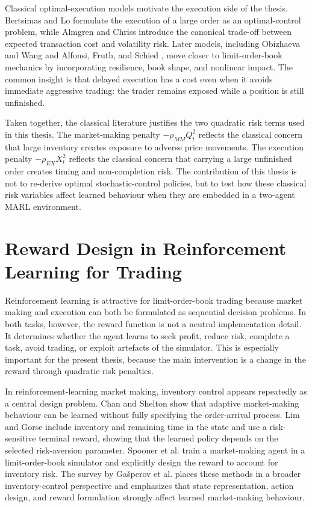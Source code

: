 \documentclass[oneside]{uva-inf-bachelor-thesis}
\begin{document}
Classical optimal-execution models motivate the execution side of the thesis. Bertsimas and Lo \cite{bertsimas_optimal_1998} formulate the execution of a large order as an optimal-control problem, while Almgren and Chriss \cite{almgren2000} introduce the canonical trade-off between expected transaction cost and volatility risk. Later models, including Obizhaeva and Wang \cite{obizhaeva_optimal_2005} and Alfonsi, Fruth, and Schied \cite{alfonsi_optimal_2010}, move closer to limit-order-book mechanics by incorporating resilience, book shape, and nonlinear impact. The common insight is that delayed execution has a cost even when it avoids immediate aggressive trading: the trader remains exposed while a position is still unfinished.

Taken together, the classical literature justifies the two quadratic risk terms used in this thesis. The market-making penalty \(-\rho_{MM}Q_t^2\) reflects the classical concern that large inventory creates exposure to adverse price movements. The execution penalty \(-\rho_{EX}X_t^2\) reflects the classical concern that carrying a large unfinished order creates timing and non-completion risk. The contribution of this thesis is not to re-derive optimal stochastic-control policies, but to test how these classical risk variables affect learned behaviour when they are embedded in a two-agent MARL environment.

\section{Reward Design in Reinforcement Learning for Trading}

Reinforcement learning is attractive for limit-order-book trading because market making and execution can both be formulated as sequential decision problems. In both tasks, however, the reward function is not a neutral implementation detail. It determines whether the agent learns to seek profit, reduce risk, complete a task, avoid trading, or exploit artefacts of the simulator. This is especially important for the present thesis, because the main intervention is a change in the reward through quadratic risk penalties.

In reinforcement-learning market making, inventory control appears repeatedly as a central design problem. Chan and Shelton \cite{chan_electronic_2001} show that adaptive market-making behaviour can be learned without fully specifying the order-arrival process. Lim and Gorse \cite{lim_reinforcement_nodate} include inventory and remaining time in the state and use a risk-sensitive terminal reward, showing that the learned policy depends on the selected risk-aversion parameter. Spooner et al. \cite{spooner_market_2018} train a market-making agent in a limit-order-book simulator and explicitly design the reward to account for inventory risk. The survey by Gašperov et al. \cite{gasperov_reinforcement_2021} places these methods in a broader inventory-control perspective and emphasizes that state representation, action design, and reward formulation strongly affect learned market-making behaviour.
\end{document}
